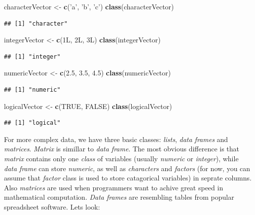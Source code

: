 \documentclass[]{book}
\newenvironment{Shaded}{\begin{snugshade}}{\end{snugshade}}
\newcommand{\KeywordTok}[1]{\textcolor[rgb]{0.12,0.11,0.11}{\textbf{#1}}}
\newcommand{\FloatTok}[1]{\textcolor[rgb]{0.69,0.50,0.00}{#1}}
\newcommand{\StringTok}[1]{\textcolor[rgb]{0.75,0.01,0.01}{#1}}
\newcommand{\OtherTok}[1]{\textcolor[rgb]{0.00,0.43,0.16}{#1}}
\newcommand{\NormalTok}[1]{\textcolor[rgb]{0.12,0.11,0.11}{#1}}
\theoremstyle{definition}
\theoremstyle{definition}
\theoremstyle{definition}
\theoremstyle{remark}
\begin{document}
\begin{Shaded}
\begin{Highlighting}[]
\NormalTok{characterVector <-}\StringTok{ }\KeywordTok{c}\NormalTok{(}\StringTok{'a'}\NormalTok{, }\StringTok{'b'}\NormalTok{, }\StringTok{'c'}\NormalTok{)}
\KeywordTok{class}\NormalTok{(characterVector)}
\end{Highlighting}
\end{Shaded}

\begin{verbatim}
## [1] "character"
\end{verbatim}

\begin{Shaded}
\begin{Highlighting}[]
\NormalTok{integerVector <-}\StringTok{ }\KeywordTok{c}\NormalTok{(1L, 2L, 3L)}
\KeywordTok{class}\NormalTok{(integerVector)}
\end{Highlighting}
\end{Shaded}

\begin{verbatim}
## [1] "integer"
\end{verbatim}

\begin{Shaded}
\begin{Highlighting}[]
\NormalTok{numericVector <-}\StringTok{ }\KeywordTok{c}\NormalTok{(}\FloatTok{2.5}\NormalTok{, }\FloatTok{3.5}\NormalTok{, }\FloatTok{4.5}\NormalTok{)}
\KeywordTok{class}\NormalTok{(numericVector)}
\end{Highlighting}
\end{Shaded}

\begin{verbatim}
## [1] "numeric"
\end{verbatim}

\begin{Shaded}
\begin{Highlighting}[]
\NormalTok{logicalVector <-}\StringTok{ }\KeywordTok{c}\NormalTok{(}\OtherTok{TRUE}\NormalTok{, }\OtherTok{FALSE}\NormalTok{)}
\KeywordTok{class}\NormalTok{(logicalVector)}
\end{Highlighting}
\end{Shaded}

\begin{verbatim}
## [1] "logical"
\end{verbatim}

For more complex data, we have three basic classes: \emph{lists},
\emph{data frames} and \emph{matrices}. \emph{Matrix} is simillar to
\emph{data frame}. The most obvious difference is that \emph{matrix}
contains only one \emph{class} of variables (usually \emph{numeric} or
\emph{integer}), while \emph{data frame} can store \emph{numeric}, as
well as \emph{characters} and \emph{factors} (for now, you can assume
that \emph{factor} class is used to store catagorical variables) in
seprate columns. Also \emph{matrices} are used when programmers want to
achive great speed in mathematical computation. \emph{Data frames} are
resembling tables from popular spreadsheet software. Lets look:
\end{document}
